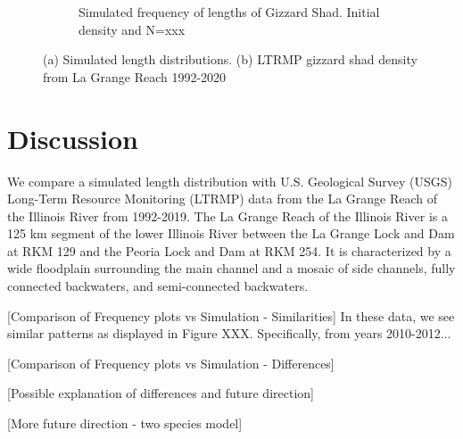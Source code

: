\documentclass[preprint,review,12pt,authoryear]{elsarticle}
\begin{document}
\begin{figure}
\begin{subfigure}[b]{.43\textwidth}
\caption{Simulated frequency of lengths of Gizzard Shad.  Initial density  and N=xxx}
\label{fig:length_dist}
\end{subfigure}
\caption{(a) Simulated length distributions. (b) LTRMP gizzard shad density from La Grange Reach 1992-2020}
\end{figure}    




\section{Discussion}


We compare a simulated length distribution with U.S. Geological Survey (USGS) Long-Term Resource Monitoring (LTRMP) data from the La Grange Reach of the Illinois River from 1992-2019. 
The La Grange Reach of the Illinois River is a 125 km segment of the lower Illinois River between the La Grange Lock and Dam at RKM 129 and the Peoria Lock and Dam at RKM 254. 
It is characterized by a wide floodplain surrounding the main channel and a mosaic of side channels, fully connected backwaters, and semi-connected backwaters.

[Comparison of Frequency plots vs Simulation - Similarities]
In these data, we see similar patterns as displayed in Figure XXX.  
Specifically, from years 2010-2012...


[Comparison of Frequency plots vs Simulation - Differences]

[Possible explanation of differences and future direction]


[More future direction - two species model]
\end{document}
